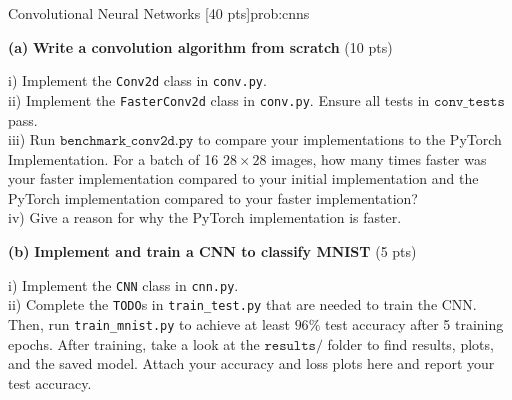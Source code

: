 
\begin{problem}{Convolutional Neural Networks \hfill [40 pts]}{prob:cnns}
\label{prob:cnns}

\begin{adjustwidth}{2em}{2em}
    
    \textbf{(a)} \textbf{Write a convolution algorithm from scratch} \hfill (10 pts)
    \begin{adjustwidth}{2em}{2em}
    
    i) Implement the \texttt{Conv2d} class in \texttt{conv.py}. \\
    
    ii) Implement the \texttt{FasterConv2d} class in \texttt{conv.py}. Ensure all tests in $\texttt{conv\_tests}$ pass.\\
    
    iii) Run $\texttt{benchmark\_conv2d.py}$ to compare your implementations to the PyTorch Implementation. For a batch of 16 $28 \times 28$ images, how many times faster was your faster implementation compared to your initial implementation and the PyTorch implementation compared to your faster implementation?
    \\
    
    iv) Give a reason for why the PyTorch implementation is faster. \\
    \end{adjustwidth} 
    \vspace{5px}

    \textbf{(b)} \textbf{Implement and train a CNN to classify MNIST} \hfill (5 pts)
    \begin{adjustwidth}{2em}{2em}
    
    i) Implement the \texttt{CNN} class in \texttt{cnn.py}. \\
    
    ii) Complete the \texttt{TODO}s in \texttt{train\_test.py} that are needed to train the CNN. Then, run \texttt{train\_mnist.py} to achieve at least $96\%$ test accuracy after 5 training epochs. After training, take a look at the $\texttt{results/}$ folder to find results, plots, and the saved model. Attach your accuracy and loss plots here and report your test accuracy.

    \\

    \end{adjustwidth} 
    \vspace{5px}


\end{adjustwidth}
\end{problem}
